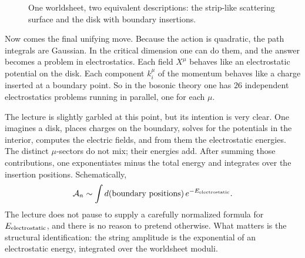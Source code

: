 \begin{figure}[h]
\centering
{}
\hspace{0.9cm}
\caption{One worldsheet, two equivalent descriptions: the strip-like scattering surface and the disk with boundary insertions.}
\end{figure}

Now comes the final unifying move. Because the action is quadratic, the path integrals are Gaussian. In the critical dimension one can do them, and the answer becomes a problem in electrostatics. Each field \(X^\mu\) behaves like an electrostatic potential on the disk. Each component \(k_i^\mu\) of the momentum behaves like a charge inserted at a boundary point. So in the bosonic theory one has \(26\) independent electrostatics problems running in parallel, one for each \(\mu\).

The lecture is slightly garbled at this point, but its intention is very clear. One imagines a disk, places charges on the boundary, solves for the potentials in the interior, computes the electric fields, and from them the electrostatic energies. The distinct \(\mu\)-sectors do not mix; their energies add. After summing those contributions, one exponentiates minus the total energy and integrates over the insertion positions. Schematically,
\begin{equation}
\mathcal{A}_n
\sim
\int d(\hbox{boundary positions})\,e^{-E_{\rm electrostatic}}.
\end{equation}
The lecture does not pause to supply a carefully normalized formula for \(E_{\rm electrostatic}\), and there is no reason to pretend otherwise. What matters is the structural identification: the string amplitude is the exponential of an electrostatic energy, integrated over the worldsheet moduli.

